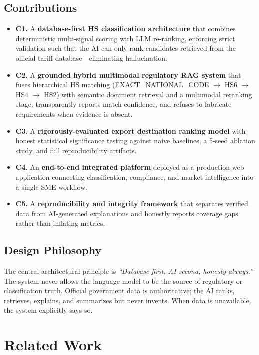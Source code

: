 \documentclass[conference]{IEEEtran}
\newcommand{\arrowto}{$\rightarrow$}
\begin{document}
\subsection{Contributions}
\begin{itemize}
\item \textbf{C1.} A \textbf{database-first HS classification
architecture} that combines deterministic multi-signal scoring with LLM
re-ranking, enforcing strict validation such that the AI can only rank
candidates retrieved from the official tariff database---eliminating
hallucination.
\item \textbf{C2.} A \textbf{grounded hybrid multimodal regulatory RAG
system} that fuses hierarchical HS matching (EXACT\_NATIONAL\_CODE
\arrowto{} HS6 \arrowto{} HS4 \arrowto{} HS2) with semantic document
retrieval and a multimodal reranking stage, transparently reports match
confidence, and refuses to fabricate requirements when evidence is absent.
\item \textbf{C3.} A \textbf{rigorously-evaluated export destination
ranking model} with honest statistical significance testing against naive
baselines, a 5-seed ablation study, and full reproducibility artifacts.
\item \textbf{C4.} An \textbf{end-to-end integrated platform} deployed as
a production web application connecting classification, compliance, and
market intelligence into a single SME workflow.
\item \textbf{C5.} A \textbf{reproducibility and integrity framework} that
separates verified data from AI-generated explanations and honestly
reports coverage gaps rather than inflating metrics.
\end{itemize}

\subsection{Design Philosophy}
The central architectural principle is \textit{``Database-first,
AI-second, honesty-always.''} The system never allows the language model
to be the source of regulatory or classification truth. Official
government data is authoritative; the AI ranks, retrieves, explains, and
summarizes but never invents. When data is unavailable, the system
explicitly says so.

\section{Related Work}
\end{document}

